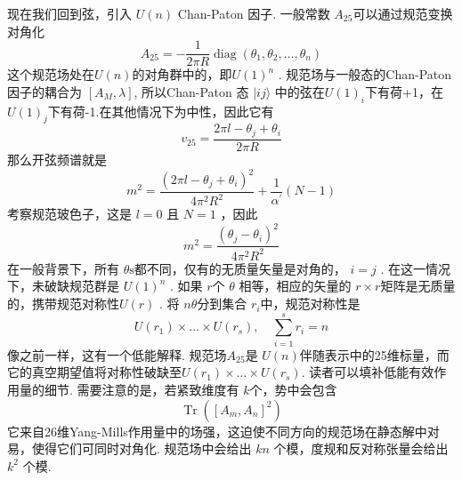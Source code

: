 现在我们回到弦，引入 $U(n)$ Chan-Paton 因子. 一般常数 $A_{25}$可以通过规范变换对角化
\begin{equation}
	A_{25}=-\frac{1}{2 \pi R} \operatorname{diag}\left(\theta_{1}, \theta_{2}, \ldots, \theta_{n}\right)
\end{equation}
这个规范场处在$U(n)$的对角群中的，即$U(1)^{n} $ . 规范场与一般态的Chan-Paton因子的耦合为 $\left[A_{M}, \lambda\right]$, 所以Chan-Paton 态 $|i j\rangle$ 中的弦在$U(1)_{i}$下有荷+1，在$U(1)_{j}$下有荷-1.在其他情况下为中性，因此它有
\begin{equation}
	v_{25}=\frac{2 \pi l-\theta_{j}+\theta_{i}}{2 \pi R}
\end{equation}
那么开弦频谱就是
\begin{equation}
	m^{2}=\frac{\left(2 \pi l-\theta_{j}+\theta_{i}\right)^{2}}{4 \pi^{2} R^{2}}+\frac{1}{\alpha^{\prime}}(N-1)
\end{equation}
考察规范玻色子，这是 $l=0$ 且 $N=1$ ，因此
\begin{equation}
	m^{2}=\frac{\left(\theta_{j}-\theta_{i}\right)^{2}}{4 \pi^{2} R^{2}}
\end{equation}
在一般背景下，所有 $\theta \mathrm{s}$都不同，仅有的无质量矢量是对角的， $i=j $ . 在这一情况下，未破缺规范群是 $U(1)^{n} $ . 如果 $r$个 $\theta$ 相等，相应的矢量的 $r \times r$矩阵是无质量的，携带规范对称性$U(r) $ . 将 $n \theta$分到集合 $r_{i}$中，规范对称性是
\begin{equation}
	U\left(r_{1}\right) \times \ldots \times U\left(r_{s}\right), \quad \sum_{i=1}^{s} r_{i}=n
\end{equation}
像之前一样，这有一个低能解释. 规范场$A_{25}$是 $U(n)$伴随表示中的25维标量，而它的真空期望值将对称性破缺至$U\left(r_{1}\right) \times \ldots \times U\left(r_{s}\right)$.
读者可以填补低能有效作用量的细节. 需要注意的是，若紧致维度有 $k$个，势中会包含
\begin{equation}
	\operatorname{Tr}\left(\left[A_{m}, A_{n}\right]^{2}\right)
\end{equation}
它来自26维Yang-Mills作用量中的场强，这迫使不同方向的规范场在静态解中对易，使得它们可同时对角化. 规范场中会给出 $k n$ 个模，度规和反对称张量会给出 $k^{2}$ 个模.

